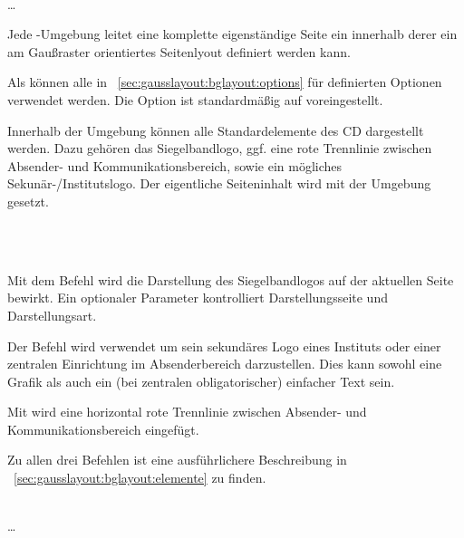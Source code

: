 \begin{Declaration}
    \\
  \quad\dots\\
\end{Declaration}

Jede -Umgebung leitet eine komplette eigenständige
Seite ein innerhalb derer ein am Gaußraster orientiertes Seitenlyout
definiert werden kann.

Als  können alle in \chaptername~\ref{sec:gausslayout:bglayout:options}
für  definierten Optionen verwendet werden.
Die Option  ist standardmäßig auf 
voreingestellt.

Innerhalb der Umgebung können alle Standardelemente
des CD dargestellt werden. Dazu gehören das Siegelbandlogo,
ggf. eine rote Trennlinie zwischen Absender- und Kommunikationsbereich,
sowie ein mögliches Sekunär-/Institutslogo.
Der eigentliche Seiteninhalt wird mit der Umgebung  gesetzt.


\begin{Declaration}
  \\
  \\
\end{Declaration}

Mit dem Befehl  wird die Darstellung des Siegelbandlogos
auf der aktuellen Seite bewirkt. Ein optionaler Parameter kontrolliert
Darstellungsseite und Darstellungsart.

Der Befehl  wird verwendet um sein sekundäres Logo
eines Instituts oder einer zentralen Einrichtung im Absenderbereich
darzustellen. Dies kann sowohl eine Grafik als auch ein
(bei zentralen obligatorischer) einfacher Text sein.

Mit  wird eine horizontal rote Trennlinie zwischen
Absender- und Kommunikationsbereich eingefügt.

Zu allen drei Befehlen ist eine ausführlichere Beschreibung
in \chaptername~\ref{sec:gausslayout:bglayout:elemente} zu finden.

\begin{Declaration}
    \\
  \quad\dots\\
\end{Declaration}


